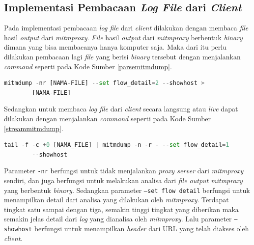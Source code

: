 \subsection{Implementasi Pembacaan \textit{Log File} dari \textit{Client}}
Pada implementasi pembacaan \textit{log file} dari \textit{client} dilakukan dengan membaca \textit{file} hasil \textit{output} dari \textit{mitmproxy}. \textit{File} hasil \textit{output} dari \textit{mitmproxy} berbentuk \textit{binary} dimana yang bisa membacanya hanya komputer saja. Maka dari itu perlu dilakukan pembacaan lagi \textit{file} yang berisi \textit{binary} tersebut dengan menjalankan \textit{command} seperti pada Kode Sumber \ref{parsemitmdump}.\\
\begin{minipage}{\linewidth}
	\begin{lstlisting}[caption=Perintah untuk Membaca \textit{File Log} dari \textit{Mitmproxy},language=Python,label=parsemitmdump]
	mitmdump -nr [NAMA-FILE] --set flow_detail=2 --showhost > 
		[NAMA-FILE]
	\end{lstlisting}
\end{minipage}
Sedangkan untuk membaca \textit{log file} dari \textit{client} secara langsung atau \textit{live} dapat dilakukan dengan menjalankan \textit{command} seperti pada Kode Sumber \ref{streammitmdump}.\\
\begin{minipage}{\linewidth}
	\begin{lstlisting}[caption=Perintah untuk Membaca \textit{File Log} dari \textit{Client},language=Python,label=streammitmdump]
	tail -f -c +0 [NAMA_FILE] | mitmdump -n -r - --set flow_detail=1
		--showhost
	\end{lstlisting}
\end{minipage}

Parameter \texttt{-nr} berfungsi untuk tidak menjalankan \textit{proxy server} dari \textit{mitmproxy} sendiri, dan juga berfungsi untuk melakukan analisa dari \textit{file output mitmproxy} yang berbentuk \textit{binary}. Sedangkan parameter \texttt{--set flow detail} berfungsi untuk menampilkan detail dari analisa yang dilakukan oleh \textit{mitmproxy}. Terdapat tingkat satu sampai dengan tiga, semakin tinggi tingkat yang diberikan maka semakin jelas detail dari \textit{log} yang dianalisa oleh \textit{mitmproxy}. Lalu parameter \texttt{--showhost} berfungsi untuk menampilkan \textit{header} dari URL yang telah diakses oleh \textit{client}.

